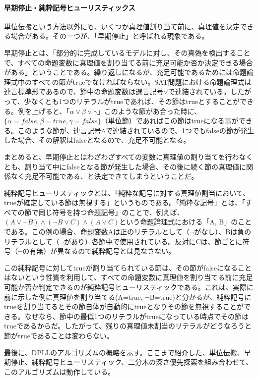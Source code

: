 \documentclass[dvipdfmx]{jsarticle}
\begin{document}
\paragraph{早期停止・純粋記号ヒューリスティックス}
単位伝搬という方法以外にも、いくつか真理値割り当て前に、真理値を決定できる場合がある。その一つが、「早期停止」と呼ばれる現象である。\par
早期停止とは、「部分的に完成しているモデルに対し、その真偽を検出することで、すべての命題変数に真理値を割り当てる前に充足可能か否か決定できる場合がある」ということである。繰り返しになるが、充足可能であるためには命題論理式中のすべての節がtrueでなければならない。SAT問題における命題論理式は連言標準形であるので、節中の命題変数は選言記号$\vee$で連結されている。したがって、少なくとも1つのリテラルがtrueであれば、その節はtrueとすることができる。例を上げると、「$\alpha \vee \beta \vee \gamma$」このような節があ合った時に、$\{\alpha=false, \beta=true, \gamma=false\}（単位節）$であればこの節はtrueになる事ができる。このような節が、連言記号$\wedge$で連結されているので、1つでもfalseの節が発生した場合、その解釈はfalseとなるので、充足不可能となる。\par
まとめると、早期停止とはわざわざすべての変数に真理値の割り当てを行わなくとも、割り当て中にfalseとなる節が発生した場合、その後に続く節の真理値に関係なく充足不可能である、と決定できてしまうということだ。\par
純粋記号ヒューリスティックとは、「純粋な記号に対する真理値割当において、trueが確定している節は無視する」というものである。「純粋な記号」とは、「すべての節で同じ符号を持つ命題記号」のことで、例えば、$(A \vee \neg B) \wedge (\neg B \vee C) \wedge (A \vee C)$という命題論理式における「A, B」のことである。この例の場合、命題変数Aは正のリテラルとして（$\neg$がなし）、Bは負のリテラルとして（$\neg$があり）各節中で使用されている。反対にCは、節ごとに符号（$\neg$の有無）が異なるので純粋記号とは見なさない。\par
この純粋記号に対してtrueが割り当てられている節は、その節がfalseになることはないという性質を利用して、すべての命題変数に真理値を割り当てる前に充足可能か否か判定できるのが純粋記号ヒューリスティックである。これは、実際に前に示した例に真理値を割り当てる(A=true, $\neg$B=true)と分かるが、純粋記号にtrueを割り当てるとその節自体が自動的にtrueとなりその節を無視することができる。なぜなら、節中の最低1つのリテラルがtrueになっている時点でその節はtrueであるからだ。したがって、残りの真理値未割当のリテラルがどうなろうと節がtrueであることは変わらない。\par
最後に、DPLLのアルゴリズムの概略を示す。ここまで紹介した、単位伝搬、早期停止、純粋記号ヒューリスティック、二分木の深さ優先探索を組み合わせて、このアルゴリズムは動作している。\par
\end{document}
